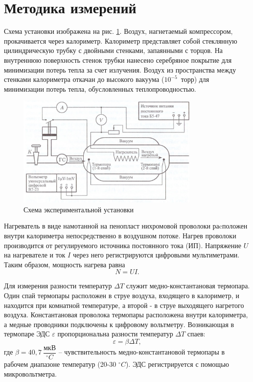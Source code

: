 \documentclass[a4paper, 12pt]{article}
\begin{document}
\section{Методика измерений}

Схема установки изображена на рис. \ref{ris2}. Воздух, нагнетаемый компрессором, прокачивается через калориметр. Калориметр представляет собой стеклянную цилиндрическую трубку с двойными стенками, запаянными с торцов. На внутреннюю поверхность стенок трубки нанесено серебряное покрытие для минимизации потерь тепла за счет излучения. Воздух из пространства между стенками калориметра откачан до высокого вакуума ($10^{-5}$~торр) для минимизации потерь тепла, обусловленных теплопроводностью.

\begin{figure}[h!]
\begin{center}
\includegraphics[width = 0.8\textwidth]{2.jpg}
\caption{Схема экспериментальной установки}
\label{ris2}
\end{center}
\end{figure}

Нагреватель в виде намотанной на пенопласт нихромовой проволоки раcположен внутри калориметра непосредственно в воздушном потоке. Нагрев проволоки производится от регулируемого источника постоянного тока (ИП). Напряжение $U$ на нагревателе и ток $I$ через него регистрируются цифровыми мультиметрами. Таким образом, мощность нагрева равна
\begin{equation}\label{3}
N = UI.
\end{equation}

Для измерения разности температур $\Delta T$ служит медно-константановая термопара. Один спай термопары расположен в струе воздуха, входящего в калориметр, и находится при комнатной температуре, а второй - в струе выходящего нагретого воздуха. Константановая проволока термопары расположена внутри калориметра, а медные проводники подключены к цифровому вольтметру. Возникающая в термопаре ЭДС $\varepsilon$ пропорциональна разности температур $\Delta T$ спаев:
\begin{equation}\label{4}
\varepsilon = \beta \Delta T,
\end{equation}
где $\beta = 40,7~\dfrac{\text{мкВ}}{ ^{\circ} C}$ -- чувствительность медно-константановой термопары в рабочем диапазоне температур (20-30 $ ^{\circ} C$). ЭДС регистрируется с помощью микровольтметра.
\end{document}
